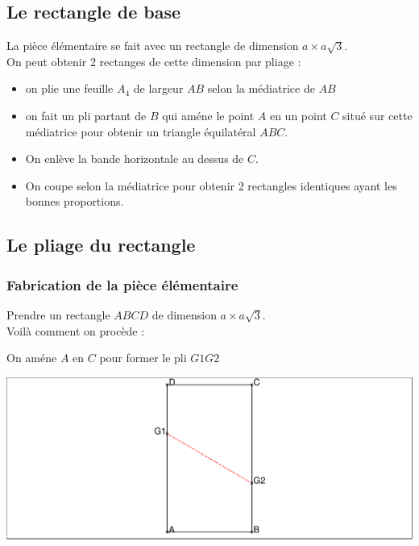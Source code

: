 \documentclass[a4paper,11pt]{book}
\begin{document}
\subsection{Le rectangle de base}
La  pi\`ece \'el\'ementaire se fait avec un rectangle de dimension
$a\times a\sqrt 3$.\\
On peut obtenir 2 rectanges de cette dimension par pliage :
\begin{itemize}
\item on plie une feuille $A_4$ de largeur $AB$ selon la m\'ediatrice de $AB$ 
\item on fait un pli partant de $B$ qui am\'ene le point $A$ en un point $C$ 
situ\'e sur cette m\'ediatrice pour obtenir un triangle \'equilat\'eral $ABC$.
\item On enl\`eve la bande horizontale au dessus de $C$.
\item On coupe selon la m\'ediatrice pour obtenir 2 rectangles identiques 
ayant les bonnes proportions.
\end{itemize}
\subsection{Le pliage du rectangle}
\subsubsection{Fabrication de la pi\`ece \'el\'ementaire}
Prendre un rectangle $ABCD$ de dimension $a\times a\sqrt 3$.\\
Voil\`a comment on proc\`ede :

\noindent
\begin{minipage}[h]{7cm}
On am\'ene $A$ en $C$ pour former le pli $G1G2$
\end{minipage}
\hspace{0.5cm}
\begin{minipage}[h]{7cm}
\includegraphics[width=\textwidth]{pli1}
\end{minipage}
\end{document}
